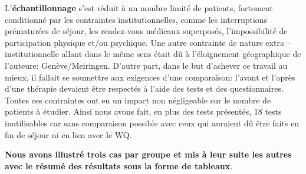  
 L'\textbf{échantillonnage} s'est réduit à un nombre limité de
 patients, fortement conditionné par les contraintes
 institutionnelles, comme les interruptions prématurées de séjour, les rendez-vous
 médicaux superposés, l'impossibilité de participation physique et/ou
 psychique.
 Une autre contrainte de nature extra -- institutionnelle allant dans le
 même sens était dû à l'éloignement géographique de l'auteure: Genève/Meiringen.
 D'autre part, dans le but d'achever ce travail au mieux, il fallait se soumettre aux exigences d'une 
 comparaison:  l'avant et l'après d'une thérapie devaient être respectés à l'aide des tests et des 
 questionnaires.
 Toutes ces contraintes ont  eu un impact non négligeable 
 sur le nombre de patients à étudier. 
 Ainsi nous avons fait, en plus des tests présentés, 18  tests  
 inutilisables car sans comparaison possible avec ceux qui auraient dû être faits en fin de séjour ni en lien 
 avec le WQ.
 

 
  \textbf{Nous avons illustré trois cas par groupe  et mis à leur suite les autres avec le résumé des 
 résultats 
 sous la forme de tableaux}.
 
 
 
 








